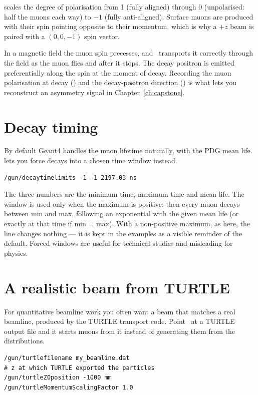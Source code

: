  scales the degree of polarisation from 1 (fully aligned) through 0 (unpolarised: half the muons each way) to \(-1\) (fully anti-aligned). Surface muons are produced with their spin pointing opposite to their momentum, which is why a \(+z\) beam is paired with a \((0,0,-1)\) spin vector.

\begin{keypoint}
In a magnetic field the muon spin precesses, and \musrSim\ transports it correctly through the field as the muon flies and after it stops. The decay positron is emitted preferentially along the spin at the moment of decay. Recording the muon polarisation at decay () and the decay-positron direction () is what lets you reconstruct an asymmetry signal in Chapter~\ref{ch:capstone}.
\end{keypoint}

\section{Decay timing}
By default Geant4 handles the muon lifetime naturally, with the PDG mean life.  lets you force decays into a chosen time window instead.

\begin{lstlisting}[style=mac,caption={Natural decay (the window is inactive because max $\le 0$)}]
/gun/decaytimelimits -1 -1 2197.03 ns
\end{lstlisting}

The three numbers are the minimum time, maximum time and mean life. The window is used only when the maximum is positive: then every muon decays between min and max, following an exponential with the given mean life (or exactly at that time if min = max). With a non-positive maximum, as here, the line changes nothing --- it is kept in the examples as a visible reminder of the default. Forced windows are useful for technical studies and misleading for physics.

\section{A realistic beam from TURTLE}
For quantitative beamline work you often want a beam that matches a real beamline, produced by the TURTLE transport code. Point \musrSim\ at a TURTLE output file and it starts muons from it instead of generating them from the  distributions.

\begin{lstlisting}[style=mac,caption={Driving the beam from a TURTLE file}]
/gun/turtlefilename my_beamline.dat
# z at which TURTLE exported the particles
/gun/turtleZ0position -1000 mm
/gun/turtleMomentumScalingFactor 1.0
\end{lstlisting}

